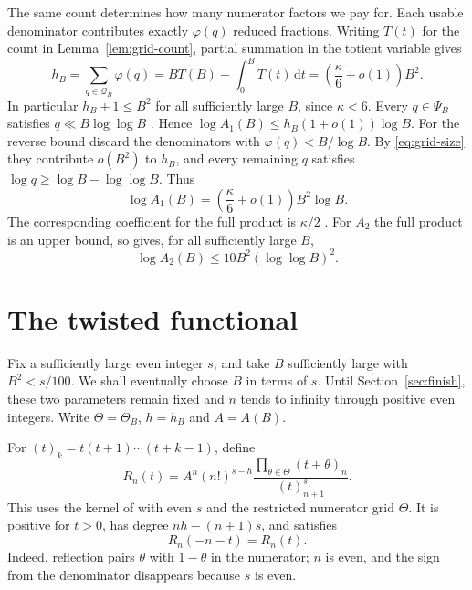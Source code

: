 \documentclass[11pt]{article}
\theoremstyle{remark}
\newcommand{\dd}{\,\mathrm d}
\numberwithin{equation}{section}
\begin{document}
The same count determines how many numerator factors we pay for. Each
usable denominator contributes exactly $\varphi(q)$ reduced fractions.
Writing $T(t)$ for the count in Lemma~\ref{lem:grid-count}, partial
summation in the totient variable gives
\begin{equation}\label{eq:grid-size}
 h_B=\sum_{q\in\mathcal Q_B}\varphi(q)
     =B T(B)-\int_0^B T(t)\dd t
     =\left(\frac{\kappa}{6}+o(1)\right)B^2 .
\end{equation}
In particular $h_B+1\leq B^2$ for all sufficiently large $B$, since
$\kappa<6$. Every $q\in\Psi_B$ satisfies $q\ll B\log\log B$
\cite[(2.2)]{LY}. Hence $\log A_1(B)\leq h_B(1+o(1))\log B$.
For the reverse bound discard the denominators with $\varphi(q)<B/\log B$.
By \eqref{eq:grid-size} they contribute $o(B^2)$ to $h_B$, and every
remaining $q$ satisfies $\log q\geq\log B-\log\log B$. Thus
\begin{equation}\label{eq:A1}
 \log A_1(B)=\left(\frac{\kappa}{6}+o(1)\right)B^2\log B .
\end{equation}
The corresponding coefficient for the full product is $\kappa/2$
\cite[Lemma~2.2]{FLSZ}. For $A_2$ the full product is an upper bound, so
\cite[Lemma~2.2]{FLSZ} gives, for all sufficiently large $B$,
\begin{equation}\label{eq:A2}
 \log A_2(B)\leq 10 B^2(\log\log B)^2 .
\end{equation}

\section{The twisted functional}
\label{sec:functional}
Fix a sufficiently large even integer $s$, and take $B$ sufficiently large
with $B^2<s/100$. We shall eventually choose $B$ in terms of $s$.
Until Section~\ref{sec:finish}, these two parameters remain fixed and
$n$ tends to infinity through positive even integers. Write $\Theta=\Theta_B$,
$h=h_B$ and $A=A(B)$.

For $(t)_k=t(t+1)\cdots(t+k-1)$, define
\begin{equation}\label{eq:kernel}
 R_n(t)=A^n(n!)^{s-h}
        \frac{\prod_{\theta\in\Theta}(t+\theta)_n}{(t)_{n+1}^{s}}.
\end{equation}
This uses the kernel of \cite[(2.1)]{FLSZ} with even $s$ and the
restricted numerator grid $\Theta$. It is positive
for $t>0$, has degree $nh-(n+1)s$, and satisfies
\begin{equation}\label{eq:reflection}
 R_n(-n-t)=R_n(t).
\end{equation}
Indeed, reflection pairs $\theta$ with $1-\theta$ in the numerator;
$n$ is even, and the sign from the denominator disappears because $s$
is even.
\end{document}
